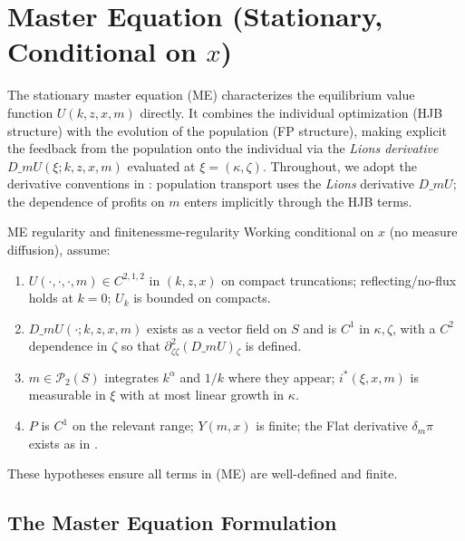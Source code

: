 ﻿\documentclass[11pt,letterpaper,oneside]{article}
\numberwithin{equation}{section}
\newcommand{\1}{\mathbf{1}}
\newcommand{\dmU}{D\_m U}
\newcommand{\Dm}{D\_m}
\begin{document}
\section[Master Equation (Stationary, Conditional on x)]{Master Equation (Stationary, Conditional on $x$)}\label{sec:master-equation}
The stationary master equation (ME) characterizes the equilibrium value function $U(k,z,x,m)$ directly. It combines the individual optimization (HJB structure) with the evolution of the population (FP structure), making explicit the feedback from the population onto the individual via the \emph{Lions derivative} $\dmU(\xi;k,z,x,m)$ evaluated at $\xi=(\kappa,\zeta)$. Throughout, we adopt the derivative conventions in : population transport uses the \emph{Lions} derivative $\Dm U$; the dependence of profits on $m$ enters implicitly through the HJB terms.

\begin{assumption}{ME regularity and finiteness}{me-regularity}
Working conditional on $x$ (no measure diffusion), assume:
\begin{enumerate}[label=(\alph*),itemsep=0.2em]
  \item $U(\cdot,\cdot,\cdot, m)\in C^{2,1,2}$ in $(k,z,x)$ on compact truncations; reflecting/no-flux holds at $k=0$; $U_k$ is bounded on compacts.
  \item $\Dm U(\cdot; k,z,x,m)$ exists as a vector field on $S$ and is $C^1$ in $\kappa,\zeta$, with a $C^2$ dependence in $\zeta$ so that $\partial_{\zeta\zeta}^2(\Dm U)\!_{\zeta}$ is defined.
  \item $m\in\mathcal P_2(S)$ integrates $k^\alpha$ and $1/k$ where they appear; $i^*(\xi,x,m)$ is measurable in $\xi$ with at most linear growth in $\kappa$.
  \item $P$ is $C^1$ on the relevant range; $Y(m,x)$ is finite; the Flat derivative $\delta_m \pi$ exists as in .
\end{enumerate}
These hypotheses ensure all terms in (ME) are well-defined and finite.
\end{assumption}

\subsection{The Master Equation Formulation}\label{sec:me-formulation}
\end{document}
